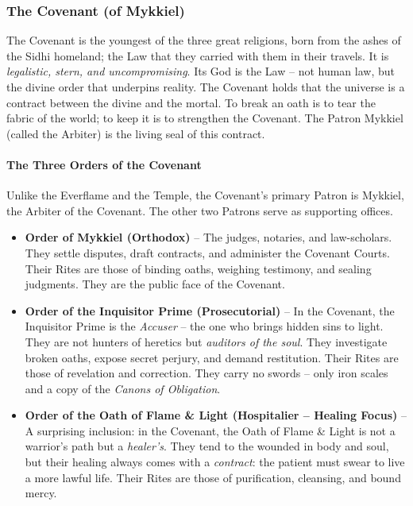 \subsubsection{The Covenant (of Mykkiel)}
\label{sec:covenant}

The Covenant is the youngest of the three great religions, born from the ashes of the Sidhi homeland; the Law that they carried with them in their travels. It is \textit{legalistic, stern, and uncompromising}. Its God is the Law -- not human law, but the divine order that underpins reality. The Covenant holds that the universe is a contract between the divine and the mortal. To break an oath is to tear the fabric of the world; to keep it is to strengthen the Covenant. The Patron Mykkiel (called the Arbiter) is the living seal of this contract.

\paragraph{The Three Orders of the Covenant}
Unlike the Everflame and the Temple, the Covenant's primary Patron is Mykkiel, the Arbiter of the Covenant. The other two Patrons serve as supporting offices.

\begin{itemize}
  \item \textbf{Order of Mykkiel (Orthodox)} -- The judges, notaries, and law-scholars. They settle disputes, draft contracts, and administer the Covenant Courts. Their Rites are those of binding oaths, weighing testimony, and sealing judgments. They are the public face of the Covenant.
  \item \textbf{Order of the Inquisitor Prime (Prosecutorial)} -- In the Covenant, the Inquisitor Prime is the \textit{Accuser} -- the one who brings hidden sins to light. They are not hunters of heretics but \textit{auditors of the soul}. They investigate broken oaths, expose secret perjury, and demand restitution. Their Rites are those of revelation and correction. They carry no swords -- only iron scales and a copy of the \textit{Canons of Obligation}.
  \item \textbf{Order of the Oath of Flame \& Light (Hospitalier -- Healing Focus)} -- A surprising inclusion: in the Covenant, the Oath of Flame \& Light is not a warrior's path but a \textit{healer's}. They tend to the wounded in body and soul, but their healing always comes with a \textit{contract}: the patient must swear to live a more lawful life. Their Rites are those of purification, cleansing, and bound mercy.
\end{itemize}

